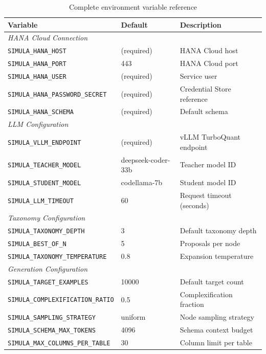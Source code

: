 \begin{table}[H]
\centering
\caption{Complete environment variable reference}
\label{tab:env-vars-complete}
\scriptsize
\begin{tabularx}{\textwidth}{@{}l l X@{}}
\toprule
\textbf{Variable} & \textbf{Default} & \textbf{Description} \\
\midrule
\multicolumn{3}{l}{\textit{HANA Cloud Connection}} \\
\texttt{SIMULA\_HANA\_HOST} & (required) & HANA Cloud host \\
\texttt{SIMULA\_HANA\_PORT} & 443 & HANA Cloud port \\
\texttt{SIMULA\_HANA\_USER} & (required) & Service user \\
\texttt{SIMULA\_HANA\_PASSWORD\_SECRET} & (required) & Credential Store reference \\
\texttt{SIMULA\_HANA\_SCHEMA} & (required) & Default schema \\
\midrule
\multicolumn{3}{l}{\textit{LLM Configuration}} \\
\texttt{SIMULA\_VLLM\_ENDPOINT} & (required) & vLLM TurboQuant endpoint \\
\texttt{SIMULA\_TEACHER\_MODEL} & deepseek-coder-33b & Teacher model ID \\
\texttt{SIMULA\_STUDENT\_MODEL} & codellama-7b & Student model ID \\
\texttt{SIMULA\_LLM\_TIMEOUT} & 60 & Request timeout (seconds) \\
\midrule
\multicolumn{3}{l}{\textit{Taxonomy Configuration}} \\
\texttt{SIMULA\_TAXONOMY\_DEPTH} & 3 & Default taxonomy depth \\
\texttt{SIMULA\_BEST\_OF\_N} & 5 & Proposals per node \\
\texttt{SIMULA\_TAXONOMY\_TEMPERATURE} & 0.8 & Expansion temperature \\
\midrule
\multicolumn{3}{l}{\textit{Generation Configuration}} \\
\texttt{SIMULA\_TARGET\_EXAMPLES} & 10000 & Default target count \\
\texttt{SIMULA\_COMPLEXIFICATION\_RATIO} & 0.5 & Complexification fraction \\
\texttt{SIMULA\_SAMPLING\_STRATEGY} & uniform & Node sampling strategy \\
\texttt{SIMULA\_SCHEMA\_MAX\_TOKENS} & 4096 & Schema context budget \\
\texttt{SIMULA\_MAX\_COLUMNS\_PER\_TABLE} & 30 & Column limit per table \\

\end{tabularx}
\end{table}
